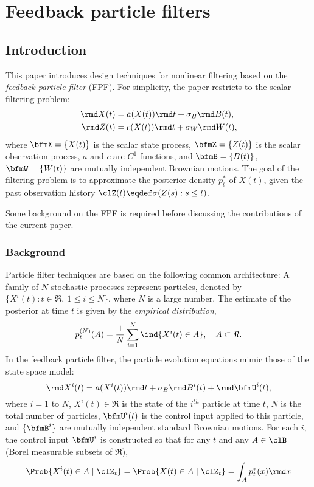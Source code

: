 \chapter{Feedback particle filters} 
\label{ch:filtering}

\section{Introduction}
\label{s:intro}


This paper introduces design techniques for nonlinear filtering based on the  \textit{feedback particle filter} (FPF).   For simplicity, the paper restricts to the scalar filtering problem:
\begin{equation*}
\begin{aligned}
\rmd X(t)&=a(X(t)) \rmd t +\sigma_{B}\rmd B(t),\\
\rmd Z(t)&=c(X(t)) \rmd t + \sigma_{W}\rmd W(t),
\end{aligned}
\end{equation*}
where $\bfmX=\{X(t)\}$ is the scalar state process, $\bfmZ=\{Z(t)\}$ is the scalar observation process, $a$ and $c$ are $C^{1}$ functions, and  $\bfmB= \{B(t)\}$,  $\bfmW = \{W(t)\}$ are mutually independent Brownian motions.   The goal of the filtering problem is to approximate the posterior density 
$p^*_t$  of $X(t)$,
given the past observation history $\clZ(t)\eqdef\sigma(Z(s):s\leq t)$.

Some background on the FPF is required before discussing the contributions of the current paper.

\subsection{Background}

Particle filter techniques are based on the following common architecture:  A family of $N$ stochastic processes represent particles, denoted by $ \{X^i(t) : t\in\Re,\ 1\le i\le N  \}$, where $N$ is a large number.   The estimate of the posterior at time $t$ is given by the
\textit{empirical distribution},
\begin{equation}
p^{(N)}_t(A)=\dfrac{1}{N}\sum_{i=1}^{N} \ind  \{X^i(t)\in A \},\quad A\subset \Re.
\label{e:emp}
\end{equation}
In the feedback particle filter,  the particle evolution equations mimic those of the state space model:
\begin{equation}
\rmd X^i(t)=a(X^i(t)) \rmd t+\sigma_{B}\rmd B^i(t)+\rmd \bfmU^i(t),
\label{eq_controlled_sys}
\end{equation}
where $i=1$ to $N$, $X^i(t) \in \Re$ is the state of the $i^{th}$ particle at time $t$, $N$ is the total number of particles, $\bfmU^i(t)$ is the control input applied to this particle, and $\{\bfmB^i\}$ are mutually independent standard Brownian motions. For each $i$, the control input $\bfmU^i$ is constructed so that for any $t$ and any $A\in\clB $  (Borel measurable subsets of $\Re$),
\[
\Prob\{ X^i(t) \in A \mid \clZ_t\} 
=
\Prob\{ X(t) \in A \mid \clZ_t\}
=
\int_A p^*_t(x) \rmd x
\]

